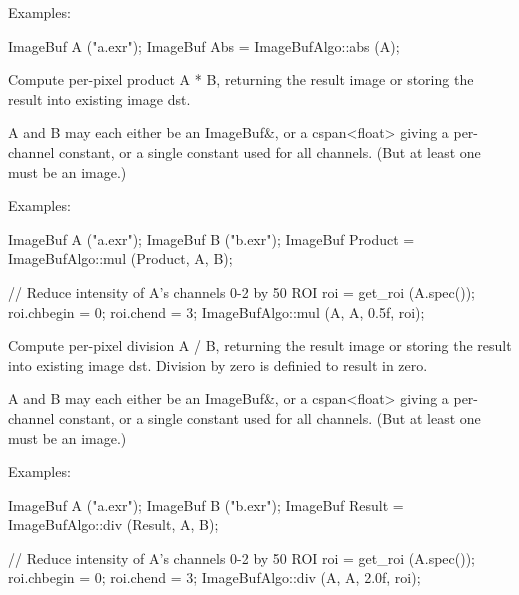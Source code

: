 \smallskip
\noindent Examples:
\begin{code}
    ImageBuf A ("a.exr");
    ImageBuf Abs = ImageBufAlgo::abs (A);
\end{code}
\apiend



 

Compute per-pixel product {\cf A * B}, returning the result image
or storing the result into existing image {\cf dst}.

{\cf A} and {\cf B} may each either be an {\cf ImageBuf\&}, or a
{\cf cspan<float>} giving a per-channel constant, or a single constant used
for all channels. (But at least one must be an image.)

\smallskip
\noindent Examples:
\begin{code}
    ImageBuf A ("a.exr");
    ImageBuf B ("b.exr");
    ImageBuf Product = ImageBufAlgo::mul (Product, A, B);

    // Reduce intensity of A's channels 0-2 by 50%
    ROI roi = get_roi (A.spec());
    roi.chbegin = 0;  roi.chend = 3;
    ImageBufAlgo::mul (A, A, 0.5f, roi);
\end{code}
\apiend


 

Compute per-pixel division {\cf A / B}, returning the result image
or storing the result into existing image {\cf dst}.
Division by zero is definied to result in zero.

{\cf A} and {\cf B} may each either be an {\cf ImageBuf\&}, or a
{\cf cspan<float>} giving a per-channel constant, or a single constant used
for all channels. (But at least one must be an image.)

\smallskip
\noindent Examples:
\begin{code}
    ImageBuf A ("a.exr");
    ImageBuf B ("b.exr");
    ImageBuf Result = ImageBufAlgo::div (Result, A, B);

    // Reduce intensity of A's channels 0-2 by 50%
    ROI roi = get_roi (A.spec());
    roi.chbegin = 0;  roi.chend = 3;
    ImageBufAlgo::div (A, A, 2.0f, roi);
\end{code}
\apiend


